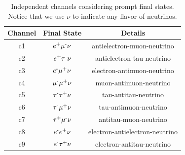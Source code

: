 \documentclass[a4paper,11pt]{article}
\begin{document}

\begin{table}
\centering{}%
\begin{tabular}{|c|c|c|}
\hline 
Channel & Final State & Details \tabularnewline
\hline 
\hline 
c1 & $e\text{\textsuperscript{+}}\mu\text{\textsuperscript{-}}\nu$ & antielectron-muon-neutrino \tabularnewline
\hline 
c2 & $e\text{\textsuperscript{+}}\tau\text{\textsuperscript{-}}\nu$ & antielectron-tau-neutrino \tabularnewline
\hline 
c3 & $e\text{\textsuperscript{-}}\mu\text{\textsuperscript{+}}\nu$ & electron-antimuon-neutrino \tabularnewline
\hline 
c4 & $\mu\text{\textsuperscript{-}}\mu\text{\textsuperscript{+}}\nu$ & muon-antimuon-neutrino \tabularnewline
\hline 
c5 & $\tau\text{\textsuperscript{-}}\tau\text{\textsuperscript{+}}\nu$ & tau-antitau-neutrino \tabularnewline
\hline 
c6 & $\tau\text{\textsuperscript{-}}\mu\text{\textsuperscript{+}}\nu$ & tau-antimuon-neutrino \tabularnewline
\hline 
c7 & $\tau\text{\textsuperscript{+}}\mu\text{\textsuperscript{-}}\nu$ & antitau-muon-neutrino \tabularnewline
\hline 
c8 & $e\text{\textsuperscript{-}}e\text{\textsuperscript{+}}\nu$ & electron-antielectron-neutrino \tabularnewline
\hline 
c9 & $e\text{\textsuperscript{-}}\tau\text{\textsuperscript{+}}\nu$ & electron-antitau-neutrino \tabularnewline
\hline 
\end{tabular}\caption{\label{tab:Independent-channels-prompt-final-states}Independent channels
considering prompt final states. Notice that we use $\nu$ to indicate
any flavor of neutrinos. }
\label{table:accesible-decay-channels-TRpV}
\end{table}
\end{document}

